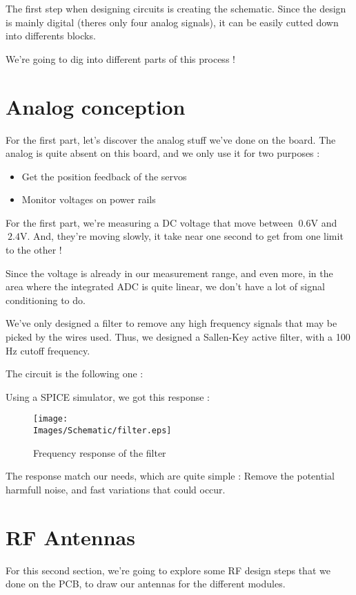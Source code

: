 The first step when designing circuits is creating the schematic.
Since the design is mainly digital (theres only four analog signals), it 
can be easily cutted down into differents blocks.

We're going to dig into different parts of this process !

\section{Analog conception}
For the first part, let's discover the analog stuff we've done on the board.
The analog is quite absent on this board, and we only use it for two purposes :
\begin{itemize}
    \item   Get the position feedback of the servos
    \item   Monitor voltages on power rails
\end{itemize}

For the first part, we're measuring a DC voltage that move between $~0.6 \si{\volt}$
and $~2.4 \si{\volt}$. And, they're moving slowly, it take near one second to get
from one limit to the other !

Since the voltage is already in our measurement range, and even more, in the area
where the integrated ADC is quite linear, we don't have a lot of signal conditioning 
to do.

We've only designed a filter to remove any high frequency signals that may be picked
by the wires used. Thus, we designed a Sallen-Key active filter, with a 100 Hz cutoff
frequency.

The circuit is the following one :


Using a SPICE simulator, we got this response : 
\begin{figure}[!hbt]
    \centering
    \texttt{[image: \\Images/Schematic/filter.eps]}
    \caption{Frequency response of the filter}
\end{figure}
\FloatBarrier

The response match our needs, which are quite simple : Remove the potential harmfull noise, 
and fast variations that could occur.

\section{RF Antennas}
For this second section, we're going to explore some RF design steps that we done on the PCB, 
to draw our antennas for the different modules.


